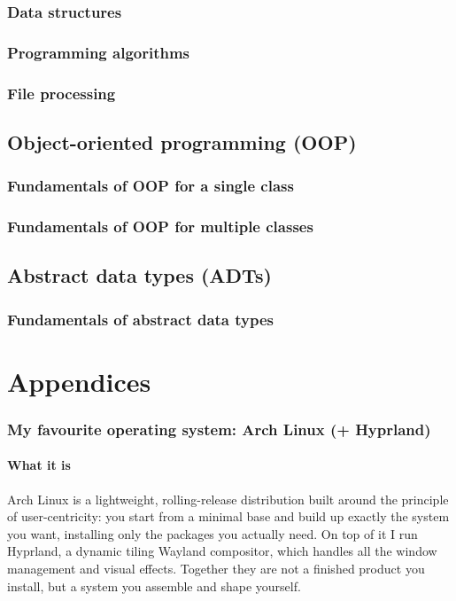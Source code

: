 \documentclass[a4paper,12pt]{article}
\begin{document}
\subsubsection{Data structures}
\subsubsection{Programming algorithms}
\subsubsection{File processing}
\subsection{Object-oriented programming (OOP)}
\subsubsection{Fundamentals of OOP for a single class}
\subsubsection{Fundamentals of OOP for multiple classes}
\subsection{Abstract data types (ADTs)}
\subsubsection{Fundamentals of abstract data types}
\newpage
\section{Appendices}
\subsubsection{My favourite operating system: Arch Linux (+ Hyprland)}
\paragraph{What it is}
Arch Linux is a lightweight, rolling-release distribution built around the principle of user-centricity: you start from a minimal base and build up exactly the system you want, installing only the packages you actually need. On top of it I run Hyprland, a dynamic tiling Wayland compositor, which handles all the window management and visual effects. Together they are not a finished product you install, but a system you assemble and shape yourself.
\end{document}

